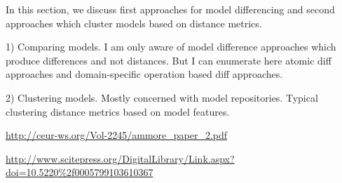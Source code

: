In this section, we discuss first approaches for model differencing and second approaches which cluster models based on distance metrics. 


1) Comparing models. I am only aware of model difference approaches which produce differences and not distances. But I can enumerate here atomic diff approaches and domain-specific operation based diff approaches.


2) Clustering models. Mostly concerned with model repositories. Typical clustering distance metrics based on model features.

\url{http://ceur-ws.org/Vol-2245/ammore_paper\_2.pdf}

\url{http://www.scitepress.org/DigitalLibrary/Link.aspx?doi=10.5220\%2f0005799103610367}

